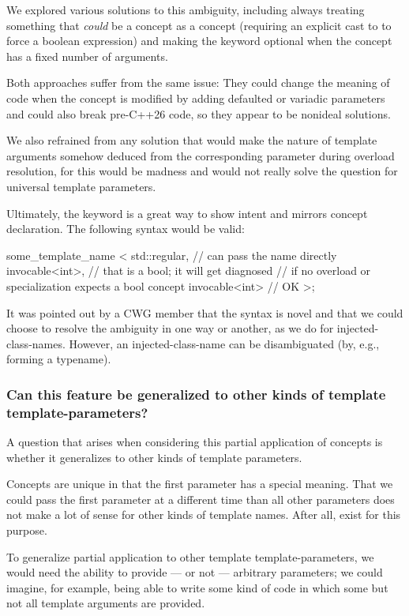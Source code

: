 \documentclass{wg21}
\begin{document}
We explored various solutions to this ambiguity, including always treating something that \emph{could} be a concept as a concept
(requiring an explicit cast to  to force a boolean expression) and making the  keyword optional when the concept has a fixed number of arguments.

Both approaches suffer from the same issue: They could change the meaning of code when the concept is modified by adding defaulted or variadic
parameters and could also break pre-C++26 code, so they appear to be nonideal solutions.

We also refrained from any solution that would make the nature of template arguments somehow deduced from the corresponding parameter during overload resolution, for this would be madness and would not really solve the question for universal template parameters.

Ultimately, the  keyword is a great way to show intent and mirrors concept declaration. The following syntax would be valid:

\begin{colorblock}
some_template_name <
    std::regular, // can pass the name directly
    invocable<int>, // that is a bool; it will get diagnosed
                    // if no overload or specialization expects a bool
    concept invocable<int> // OK
>;
\end{colorblock}

It was pointed out by a CWG member that the syntax is novel and that we could choose to resolve the ambiguity in one way or another,
as we do for injected-class-names.
However, an injected-class-name can be disambiguated (by, e.g., forming a typename).

\subsubsection{Can this feature be generalized to other kinds of template template-parameters?}

A question that arises when considering this partial application of concepts is whether it generalizes to other kinds of template parameters.

Concepts are unique in that the first parameter has a special meaning. That we could pass the first parameter at a different time than all other parameters does not make a lot of sense for other kinds of template names.
After all,  exist for this purpose.

To generalize partial application
to other template template-parameters, we would need the ability to provide --- or not --- arbitrary parameters;
we could imagine, for example, being able to write some kind of code in which some but not all template arguments are provided.
\end{document}
